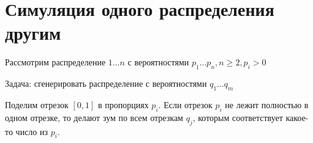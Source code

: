 \section{Симуляция одного распределения другим}

Рассмотрим распределение $1\ldots n$ с вероятностями $p_1\ldots p_n, n\geq 2, p_i>0$

Задача: сгенерировать распределение с вероятностями $q_1\ldots q_m$

Поделим отрезок $[0,1]$ в пропорциях $p_i$. Если отрезок $p_i$ не лежит полностью в одном отрезке, то делают зум по всем отрезкам $q_j$, которым соответствует какое-то число из $p_i$.

